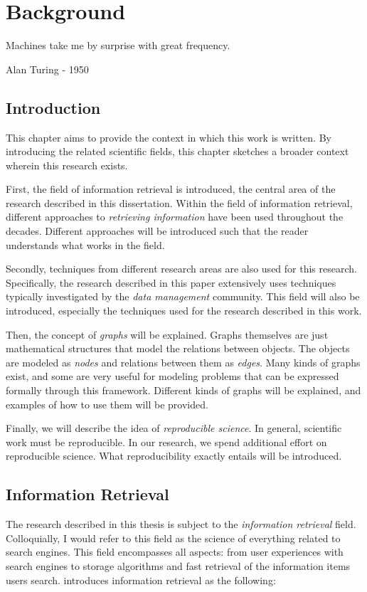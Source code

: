 \chapter{Background}
\label{related-work}

\epigraph{Machines take me by surprise with great frequency.}{Alan Turing - 1950}

\section{Introduction}
This chapter aims to provide the context in which this work is written. By introducing the related scientific fields, this chapter sketches a broader context wherein this research exists. 

First, the field of information retrieval is introduced, the central area of the research described in this dissertation. Within the field of information retrieval, different approaches to \emph{retrieving information} have been used throughout the decades. Different approaches will be introduced such that the reader understands what works in the field.

Secondly, techniques from different research areas are also used for this research. Specifically, the research described in this paper extensively uses techniques typically investigated by the \emph{data management} community. This field will also be introduced, especially the techniques used for the research described in this work. 

Then, the concept of \emph{graphs} will be explained. Graphs themselves are just mathematical structures that model the relations between objects. The objects are modeled as \emph{nodes} and relations between them as \emph{edges}. Many kinds of graphs exist, and some are very useful for modeling problems that can be expressed formally through this framework. Different kinds of graphs will be explained, and examples of how to use them will be provided.

Finally, we will describe the idea of \emph{reproducible science}. In general, scientific work must be reproducible. In our research, we spend additional effort on reproducible science. What reproducibility exactly entails will be introduced.  

\section{Information Retrieval}
The research described in this thesis is subject to the \emph{information retrieval} field. Colloquially, I would refer to this field as the science of everything related to search engines. This field encompasses all aspects: from user experiences with search engines to storage algorithms and fast retrieval of the information items users search.  introduces information retrieval as the following:

